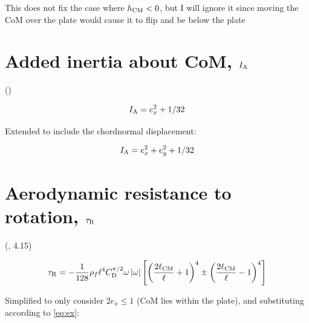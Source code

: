 \documentclass{jfm} %
\begin{document}
This does not fix the case where $h_{\textup{CM}}<0$, but I will ignore it since moving the CoM over the plate would cause it to flip and be below the plate





\section{Added inertia about CoM, $I_{\textnormal{A}}$} \label{sec:inertia}
(\cite{certini2023alsomitra})

\begin{equation}
 I_{\textnormal{A}} = e_x^2 + 1/32
\end{equation}

Extended to include the chordnormal displacement:

\begin{equation}
 I_{\textnormal{A}} = e_x^2 +e_y^2 + 1/32
\end{equation}


\section{Aerodynamic resistance to rotation, $\tau_\textnormal{R}$} \label{sec:t1}
(\cite{Li2022model}, 4.15)

\begin{equation}
\tau_\textnormal{R} = -\frac{1}{128}\rho_f\ell^4 C_{\textup{D}}^{\pi /2} \omega  \left| \omega \right| \left [ \left ( \frac{2\ell_{\textup{CM}}}{\ell}+1 \right )^4 \pm \left ( \frac{2\ell_{\textup{CM}}}{\ell}-1 \right )^4\right ]
\end{equation}

Simplified to only consider $2e_x  \leq  1$ (CoM lies within the plate), and substituting according to \ref{eq:ex}:
\end{document}
